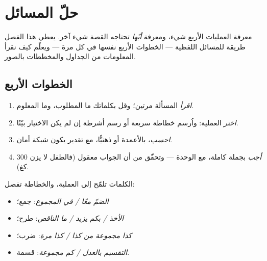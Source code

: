 \chapter{حلّ المسائل}\label{ch:g3:problems}

معرفة العمليات الأربع شيء، ومعرفة \emph{أيّها} تحتاجه القصة شيء
آخر. يعطي هذا الفصل طريقة للمسائل اللفظية --- الخطوات الأربع
نفسها في كل مرة --- ويعلّم كيف نقرأ المعلومات من الجداول
والمخططات بالصور.

\section{الخطوات الأربع}

\begin{method}\label{met:g3:problems:steps}
\begin{enumerate}
  \item \emph{اقرأ} المسألة مرتين؛ وقل بكلماتك ما المطلوب،
        وما المعلوم.
  \item \emph{اختر} العملية: واُرسم خطاطة سريعة أو رسم أشرطة
        إن لم يكن الاختيار بيّنًا.
  \item \emph{احسب}، بالأعمدة أو ذهنيًّا، مع تقدير يكون شبكة
        أمان.
  \item \emph{أجب} بجملة كاملة، مع الوحدة --- وتحقّق من أن
        الجواب معقول (فالطفل لا يزن
        $300$ كغ).
\end{enumerate}
\end{method}

\begin{example}[أي عملية؟]\label{ex:g3:problems:which}
الكلمات تلمّح إلى العملية، والخطاطة تفصل:
\begin{itemize}
  \item \emph{الضمّ معًا / في المجموع}: جمع؛
  \item \emph{الأخذ / بكم يزيد / ما الناقص}:
        طرح؛
  \item \emph{كذا مجموعة من كذا / كذا مرة}:
        ضرب؛
  \item \emph{التقسيم بالعدل / كم مجموعة}: قسمة.
\end{itemize}
\end{example}

